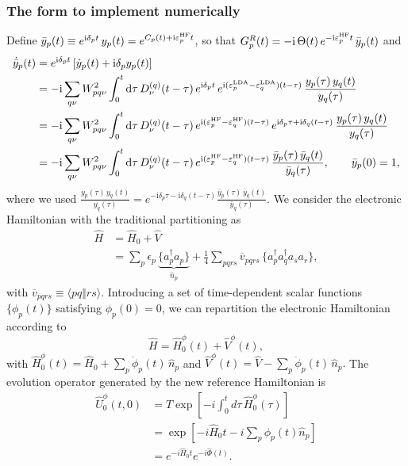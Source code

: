 \subsubsection{The form to implement numerically}
Define $\bar y_p(t) \equiv e^{\mathrm{i}\delta_p t}\, y_p(t) = e^{C_p(t)+\mathrm{i}\varepsilon_p^{\rm HF} t}$, so that
$G_p^R(t) = -\mathrm{i}\,\Theta(t)\, e^{-\mathrm{i}\varepsilon_p^{\rm HF} t}\, \bar y_p(t)$ and
\begin{align}
\dot{\bar y}_p(t) &= e^{\mathrm{i}\delta_p t}\left[\dot y_p(t) + \mathrm{i}\delta_p y_p(t)\right] \nonumber\\
&= -\mathrm{i}\sum_{q\nu} W_{pq\nu}^2 \int_0^t \mathrm{d}\tau\, D^{(q)}_\nu(t-\tau)\,
   e^{\mathrm{i}\delta_p t}\,e^{\mathrm{i}(\varepsilon_p^{\rm LDA}-\varepsilon_q^{\rm LDA})(t-\tau)}\,
   \frac{y_p(\tau)\,y_q(t)}{y_q(\tau)} \nonumber\\
&= -\mathrm{i}\sum_{q\nu} W_{pq\nu}^2 \int_0^t \mathrm{d}\tau\, D^{(q)}_\nu(t-\tau)\,
   e^{\mathrm{i}(\varepsilon_p^{\rm HF}-\varepsilon_q^{\rm HF})(t-\tau)}\,
   e^{\mathrm{i}\delta_p\tau+\mathrm{i}\delta_q(t-\tau)}\,
   \frac{y_p(\tau)\,y_q(t)}{y_q(\tau)} \nonumber\\
&= -\mathrm{i}\sum_{q\nu} W_{pq\nu}^2 \int_0^t \mathrm{d}\tau\, D^{(q)}_\nu(t-\tau)\,
   e^{\mathrm{i}(\varepsilon_p^{\rm HF}-\varepsilon_q^{\rm HF})(t-\tau)}\,
   \frac{\bar y_p(\tau)\,\bar y_q(t)}{\bar y_q(\tau)},
   \qquad \bar y_p(0)=1,
\end{align}
where we used
$\frac{y_p(\tau)\,y_q(t)}{y_q(\tau)} = e^{-\mathrm{i}\delta_p\tau-\mathrm{i}\delta_q(t-\tau)}
\frac{\bar y_p(\tau)\,\bar y_q(t)}{\bar y_q(\tau)}$.
We consider the electronic Hamiltonian with the traditional partitioning as
\begin{align}
    \hat H
    &=
    \hat H_0+\hat V\\
    &=
    \sum_p
    \epsilon_p\,
    \underbrace{\{a_p^\dagger a_p\}}_{\hat n_p} +
    \frac{1}{4}
    \sum_{pqrs}
    \overline{v}_{pqrs}\,
    \{a_p^\dagger a_q^\dagger a_s a_r\},
\end{align}
with $
    \overline{v}_{pqrs}
    \equiv
    \langle pq \Vert rs\rangle.
$
Introducing a set of time-dependent scalar
functions $\{\phi_p(t)\}$ satisfying $
    \phi_p(0)=0$, we can repartition the electronic Hamiltonian according to
\begin{equation}
    \hat H
    =
    \hat H_0^\phi(t)
    +
    \hat V^\phi(t),
\label{eq:repartitioning}
\end{equation}
with $
    \hat H_0^\phi(t)
    =
    \hat H_0
    +
    \sum_p
    \dot{\phi}_p(t)\,
    \hat n_p
$
and $
    \hat V^\phi(t)
    =
    \hat V
    -
    \sum_p
    \dot{\phi}_p(t)\,
    \hat n_p.
$
The evolution operator generated by the new reference Hamiltonian
is
\begin{align}
    \hat U_0^\phi(t,0)
    &=
    T\exp\left[
    -i
    \int_0^t
    d\tau\,
    \hat H_0^\phi(\tau)
    \right] \\
    &=
    \exp\left[
    -i\hat H_0 t
    -i\sum_p\phi_p(t)\hat n_p
    \right]
    \nonumber\\
    &=
    e^{-i\hat H_0 t}
    e^{-i\hat\Phi(t)}.
\end{align}

